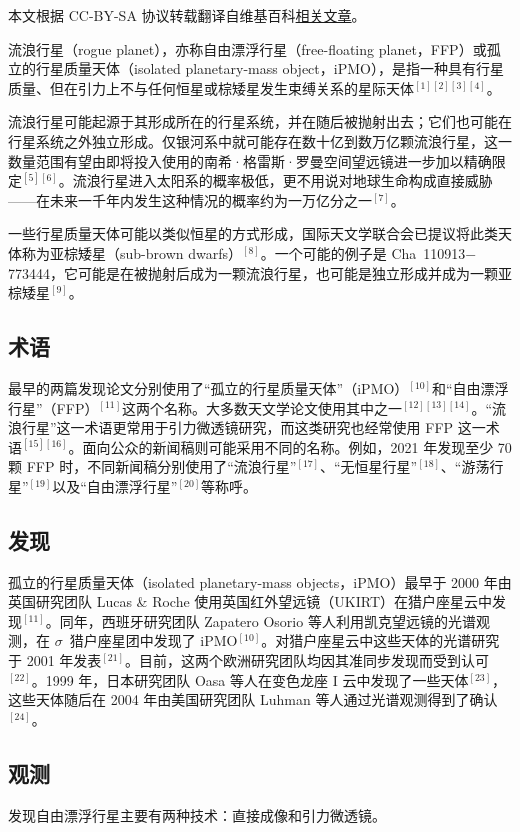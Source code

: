 
本文根据 CC-BY-SA 协议转载翻译自维基百科\href{https://en.wikipedia.org/wiki/Rogue_planet}{相关文章}。

流浪行星（rogue planet），亦称自由漂浮行星（free-floating planet，FFP）或孤立的行星质量天体（isolated planetary-mass object，iPMO），是指一种具有行星质量、但在引力上不与任何恒星或棕矮星发生束缚关系的星际天体$^{[1][2][3][4]}$。

流浪行星可能起源于其形成所在的行星系统，并在随后被抛射出去；它们也可能在行星系统之外独立形成。仅银河系中就可能存在数十亿到数万亿颗流浪行星，这一数量范围有望由即将投入使用的南希·格雷斯·罗曼空间望远镜进一步加以精确限定$^{[5][6]}$。流浪行星进入太阳系的概率极低，更不用说对地球生命构成直接威胁——在未来一千年内发生这种情况的概率约为一万亿分之一$^{[7]}$。

一些行星质量天体可能以类似恒星的方式形成，国际天文学联合会已提议将此类天体称为亚棕矮星（sub-brown dwarfs）$^{[8]}$。一个可能的例子是 Cha~110913$-$773444，它可能是在被抛射后成为一颗流浪行星，也可能是独立形成并成为一颗亚棕矮星$^{[9]}$。
\subsection{术语}
最早的两篇发现论文分别使用了“孤立的行星质量天体”（iPMO）$^{[10]}$和“自由漂浮行星”（FFP）$^{[11]}$这两个名称。大多数天文学论文使用其中之一$^{[12][13][14]}$。“流浪行星”这一术语更常用于引力微透镜研究，而这类研究也经常使用 FFP 这一术语$^{[15][16]}$。面向公众的新闻稿则可能采用不同的名称。例如，2021 年发现至少 70 颗 FFP 时，不同新闻稿分别使用了“流浪行星”$^{[17]}$、“无恒星行星”$^{[18]}$、“游荡行星”$^{[19]}$以及“自由漂浮行星”$^{[20]}$等称呼。
\subsection{发现}
孤立的行星质量天体（isolated planetary-mass objects，iPMO）最早于 2000 年由英国研究团队 Lucas \& Roche 使用英国红外望远镜（UKIRT）在猎户座星云中发现$^{[11]}$。同年，西班牙研究团队 Zapatero Osorio 等人利用凯克望远镜的光谱观测，在 $\sigma$~猎户座星团中发现了 iPMO$^{[10]}$。对猎户座星云中这些天体的光谱研究于 2001 年发表$^{[21]}$。目前，这两个欧洲研究团队均因其准同步发现而受到认可$^{[22]}$。1999 年，日本研究团队 Oasa 等人在变色龙座 I 云中发现了一些天体$^{[23]}$，这些天体随后在 2004 年由美国研究团队 Luhman 等人通过光谱观测得到了确认$^{[24]}$。
\subsection{观测}
发现自由漂浮行星主要有两种技术：直接成像和引力微透镜。
